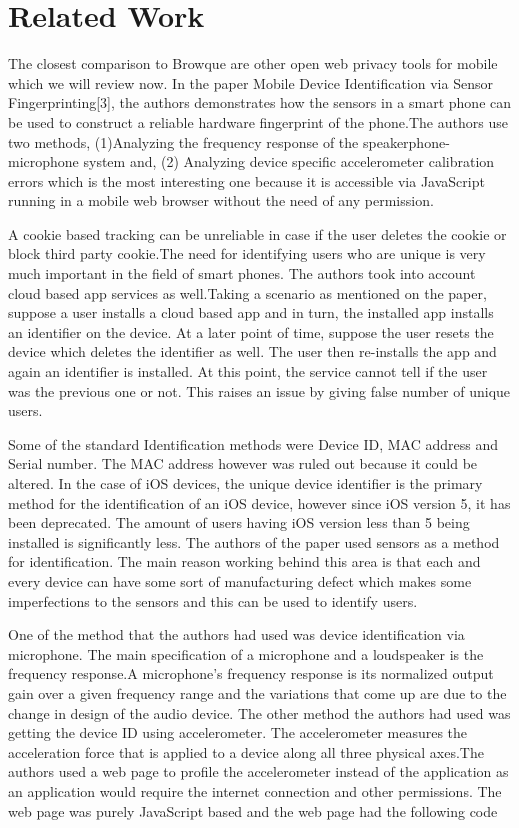 \documentclass[journal]{IEEEtran}
\begin{document}
\section*{Related Work}

The closest comparison to Browque are other open web privacy tools for mobile
which we will review now. In the paper Mobile Device Identification via Sensor
Fingerprinting[3], the authors demonstrates how the sensors in a smart phone can be used
to construct a reliable hardware fingerprint of the phone.The authors use two
methods, (1)Analyzing the frequency response of the speakerphone-microphone
system and, (2) Analyzing device specific accelerometer calibration errors which
is the most interesting one because it is accessible via JavaScript running in a mobile
web browser without the need of any permission. 

A cookie based tracking can be unreliable in case if the user deletes the cookie
or block third party cookie.The need for identifying users who are unique is very
much important in the field of smart phones. The authors took into account cloud
based app services as well.Taking a scenario as mentioned on the paper, suppose
a user installs a cloud based app and in turn, the installed app installs an
identifier on the device. At a later point of time, suppose the user resets the
device which deletes the identifier as well. The user then re-installs the app
and again an identifier is installed. At this point, the service cannot tell if
the user was the previous one or not. This raises an issue by giving false
number of unique users.

Some of the standard Identification methods were Device ID, MAC address and
Serial number. The MAC address however was ruled out because it could be
altered. In the case of iOS devices, the unique device identifier is the primary
method for the identification of an iOS device, however since iOS version 5, it
has been deprecated. The amount of users having iOS version less than 5 being
installed is significantly less. The authors of the paper used sensors as a method for
identification. The main reason working behind this area is that each and every
device can have some sort of manufacturing defect which makes some imperfections
to the sensors and this can be used to identify users.

One of the method that the authors had used was device identification via
microphone. The main specification of a microphone and a loudspeaker is the
frequency response.A microphone’s frequency response is its normalized output
gain over a given frequency range and the variations that come up are due to the
change in design of the audio device. The other method the authors had used was
getting the device ID using accelerometer. The accelerometer measures the
acceleration force that is applied to a device along all three physical axes.The
authors used a web page to profile the accelerometer instead of the application
as an application would require the internet connection and other permissions.
The web page was purely JavaScript based and the web page had the following code
\end{document}
